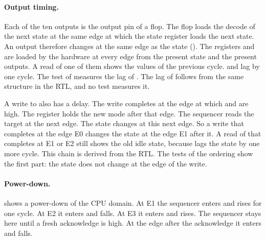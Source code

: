 \paragraph{Output timing.} Each of the ten outputs is the output pin of a flop. The flop loads the decode of the next state at the same edge at which the state register loads the next state. An output therefore changes at the same edge as the state (). The registers  and  are loaded by the hardware at every edge from the present state and the present outputs. A read of one of them shows the values of the previous cycle.  and  lag by one cycle. The test of  measures the lag of . The lag of  follows from the same structure in the RTL, and no test measures it.

A write to  also has a delay. The write completes at the edge at which  and  are high. The register holds the new mode after that edge. The sequencer reads the target at the next edge. The state changes at this next edge. So a write that completes at the edge E0 changes the state at the edge E1 after it. A read of  that completes at E1 or E2 still shows the old idle state, because  lags the state by one more cycle. This chain is derived from the RTL. The tests of the ordering show the first part: the state does not change at the edge of the write.

\paragraph{Power-down.}  shows a power-down of the CPU domain. At E1 the sequencer enters  and  rises for one cycle. At E2 it enters  and  falls. At E3 it enters  and  rises. The sequencer stays here until a fresh acknowledge is high. At the edge after the acknowledge it enters  and  falls.

